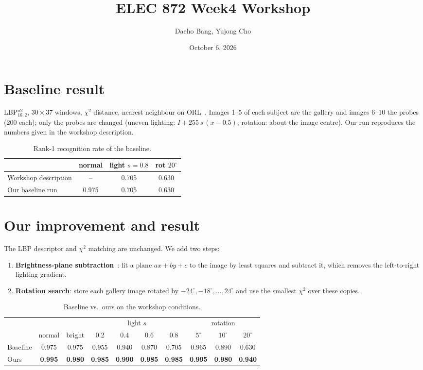\documentclass{article}
\title{ELEC 872 Week4 Workshop}
\author{Daeho Bang, Yujong Cho}
\date{October 6, 2026}
\begin{document}
\maketitle

\section{Baseline result}

LBP$^{u2}_{16,2}$, $30\times37$ windows, $\chi^2$ distance, nearest neighbour on ORL~\cite{ahonen2004face}.
Images 1--5 of each subject are the gallery and images 6--10 the probes (200 each); only the
probes are changed (uneven lighting: $I + 255\,s\,(x-0.5)$; rotation: about the image centre).
Our run reproduces the numbers given in the workshop description.

\begin{table}[H]
\centering
\begin{tabular}{lccc}
\toprule
 & normal & light $s=0.8$ & rot $20^\circ$ \\
\midrule
Workshop description & --    & 0.705 & 0.630 \\
Our baseline run     & 0.975 & 0.705 & 0.630 \\
\bottomrule
\end{tabular}
\caption{Rank-1 recognition rate of the baseline.}
\end{table}

\section{Our improvement and result}

The LBP descriptor and $\chi^2$ matching are unchanged. We add two steps:
\begin{enumerate}
  \item \textbf{Brightness-plane subtraction}~\cite{sung1998example}: fit a plane
        $ax+by+c$ to the image by least squares and subtract it, which removes the
        left-to-right lighting gradient.
  \item \textbf{Rotation search}: store each gallery image rotated by
        $-24^\circ, -18^\circ, \dots, 24^\circ$ and use the smallest $\chi^2$ over these copies.
\end{enumerate}

\begin{table}[H]
\centering
\begin{tabular}{lccccccccc}
\toprule
 & & & \multicolumn{4}{c}{light $s$} & \multicolumn{3}{c}{rotation} \\
\cmidrule(lr){4-7}\cmidrule(lr){8-10}
 & normal & bright & 0.2 & 0.4 & 0.6 & 0.8 & $5^\circ$ & $10^\circ$ & $20^\circ$ \\
\midrule
Baseline & 0.975 & 0.975 & 0.955 & 0.940 & 0.870 & 0.705 & 0.965 & 0.890 & 0.630 \\
Ours     & \textbf{0.995} & \textbf{0.980} & \textbf{0.985} & \textbf{0.990} & \textbf{0.985} & \textbf{0.985} & \textbf{0.995} & \textbf{0.980} & \textbf{0.940} \\
\bottomrule
\end{tabular}
\caption{Baseline vs.\ ours on the workshop conditions.}
\end{table}
\end{document}
